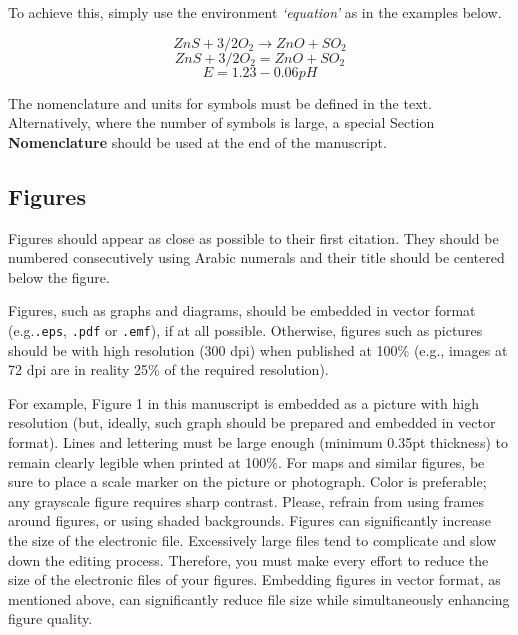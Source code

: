 \documentclass[a4paper, 10pt, twocolumn, twoside]{article}
\begin{document}
To achieve this, simply use the environment {\it `equation'} as in the examples below.


\begin{equation}\label{eq_1}
ZnS + 3/2O_2 \rightarrow ZnO + SO_2
\end{equation}
\begin{equation}\label{eq_2}
ZnS + 3/2O_2 = ZnO+ SO_2
\end{equation}
\begin{equation}\label{eq_3}
E = 1.23 - 0.06 pH
\end{equation}

The nomenclature and units for symbols must be defined in the text. Alternatively, where the number of symbols is large, a special Section  \textbf{Nomenclature} should be used at the end of the manuscript.

\subsection{Figures}

Figures should appear as close as possible to their first citation. 
They should be numbered consecutively using Arabic numerals and their title should be centered below the figure.

Figures, such as graphs and diagrams, should be embedded in vector format (e.g.\verb|.eps|, \verb|.pdf| or \verb|.emf|), if at all possible. 
Otherwise, figures such as pictures should be with high resolution (300 dpi) when published at 100\% (e.g., images at 72 dpi are in reality 25\% of the required resolution).

For example, Figure 1 in this manuscript is embedded as a picture with high resolution (but, ideally, such graph should be prepared and embedded in vector format).
Lines and lettering must be large enough (minimum 0.35pt thickness) to remain clearly legible when printed at 100\%. 
For maps and similar figures, be sure to place a scale marker on the picture or photograph. 
Color is preferable; any grayscale figure requires sharp contrast. 
Please, refrain from using frames around figures, or using shaded backgrounds.
Figures can significantly increase the size of the electronic file. Excessively large files tend to complicate and slow down the editing process. Therefore, you must make every effort to reduce the size of the electronic files of your figures. Embedding figures in vector format, as mentioned above, can significantly reduce file size while simultaneously enhancing figure quality.
\end{document}
